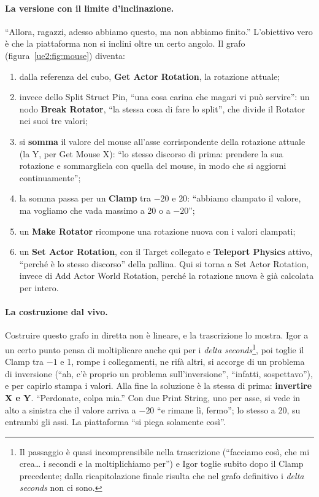 \paragraph{La versione con il limite d'inclinazione.} ``Allora, ragazzi, adesso abbiamo
questo, ma non abbiamo finito.'' L'obiettivo vero è che la piattaforma non si inclini
oltre un certo angolo. Il grafo (figura~\ref{ue2:fig:mouse}) diventa:
\begin{enumerate}
  \item dalla referenza del cubo, \textbf{Get Actor Rotation}, la rotazione attuale;
  \item invece dello Split Struct Pin, ``una cosa carina che magari vi può servire'':
        un nodo \textbf{Break Rotator}, ``la stessa cosa di fare lo split'', che divide
        il Rotator nei suoi tre valori;
  \item si \textbf{somma} il valore del mouse all'asse corrispondente della rotazione
        attuale (la Y, per Get Mouse X): ``lo stesso discorso di prima: prendere la
        sua rotazione e sommargliela con quella del mouse, in modo che si aggiorni
        continuamente'';
  \item la somma passa per un \textbf{Clamp} tra $-20$ e $20$: ``abbiamo clampato il
        valore, ma vogliamo che vada massimo a 20 o a $-20$'';
  \item un \textbf{Make Rotator} ricompone una rotazione nuova con i valori clampati;
  \item un \textbf{Set Actor Rotation}, con il Target collegato e \textbf{Teleport
        Physics} attivo, ``perché è lo stesso discorso'' della pallina. Qui si torna a
        Set Actor Rotation, invece di Add Actor World Rotation, perché la rotazione
        nuova è già calcolata per intero.
\end{enumerate}

\paragraph{La costruzione dal vivo.} Costruire questo grafo in diretta non è lineare, e
la trascrizione lo mostra. Igor a un certo punto pensa di moltiplicare anche qui per i
\emph{delta seconds}\footnote{Il passaggio è quasi incomprensibile nella trascrizione
(``facciamo così, che mi crea\ldots{} i secondi e la moltiplichiamo per'') e Igor
toglie subito dopo il Clamp precedente; dalla ricapitolazione finale risulta che nel
grafo definitivo i \emph{delta seconds} non ci sono.}, poi toglie il Clamp tra $-1$ e
1, rompe i collegamenti, ne rifà altri, si accorge di un problema di inversione (``ah,
c'è proprio un problema sull'inversione'', ``infatti, sospettavo''), e per capirlo
stampa i valori. Alla fine la soluzione è la stessa di prima: \textbf{invertire X e
Y}. ``Perdonate, colpa mia.'' Con due Print String, uno per asse, si vede in alto a
sinistra che il valore arriva a $-20$ ``e rimane lì, fermo''; lo stesso a 20, su
entrambi gli assi. La piattaforma ``si piega solamente così''.

